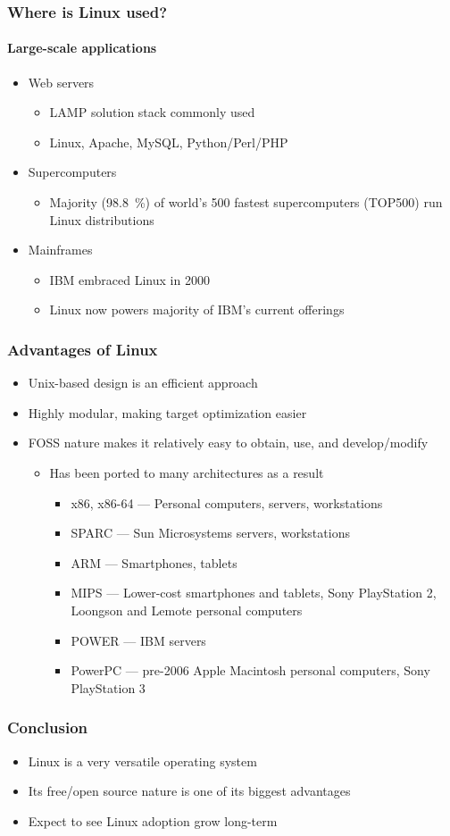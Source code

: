 \documentclass{beamer}
\begin{document}
\begin{frame}
  \frametitle{Where is Linux used?}
  \framesubtitle{Large-scale applications}
  \begin{itemize}
  \item Web servers \begin{itemize}
    \item LAMP solution stack commonly used
    \item Linux, Apache, MySQL, Python/Perl/PHP
    \end{itemize} \pause
  \item Supercomputers \begin{itemize}
    \item Majority (\SI{98.8}{\percent}) of world's 500 fastest supercomputers (TOP500) run Linux distributions
    \end{itemize} \pause
  \item Mainframes \begin{itemize}
    \item IBM embraced Linux in 2000
    \item Linux now powers majority of IBM's current offerings
    \end{itemize}
  \end{itemize}
\end{frame}

\begin{frame}
  \frametitle{Advantages of Linux}
  \begin{itemize}
  \item Unix-based design is an efficient approach
  \item Highly modular, making target optimization easier
  \item FOSS nature makes it relatively easy to obtain, use, and develop/modify
    \begin{itemize}
    \item Has been ported to many architectures as a result \pause
      \begin{itemize}
      \item x86, x86-64 --- Personal computers, servers, workstations \pause
      \item SPARC --- Sun Microsystems servers, workstations \pause
      \item ARM --- Smartphones, tablets \pause
      \item MIPS --- Lower-cost smartphones and tablets, Sony PlayStation 2, Loongson and Lemote personal computers \pause
      \item POWER --- IBM servers \pause
      \item PowerPC --- pre-2006 Apple Macintosh personal computers, Sony PlayStation 3
      \end{itemize}
    \end{itemize}
  \end{itemize}
\end{frame}

\begin{frame}
  \frametitle{Conclusion}
  \begin{itemize}
  \item Linux is a very versatile operating system
  \item Its free/open source nature is one of its biggest advantages
  \item Expect to see Linux adoption grow long-term
  \end{itemize}
\end{frame}
\end{document}
